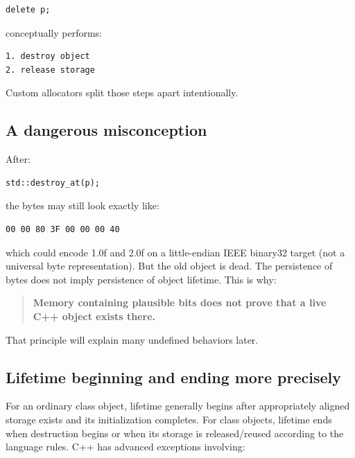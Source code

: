 \begin{verbatim}
delete p;
\end{verbatim}

conceptually performs:

\begin{verbatim}
1. destroy object
2. release storage
\end{verbatim}

Custom allocators split those steps apart intentionally.

\subsection{A dangerous misconception}\label{01-foundations-i-ch002-a-dangerous-misconception}

\hypertarget{01-foundations-i-ch002-a-dangerous-misconception}{}

After:

\begin{verbatim}
std::destroy_at(p);
\end{verbatim}

the bytes may still look exactly like:

\begin{verbatim}
00 00 80 3F 00 00 00 40
\end{verbatim}

which could encode 1.0f and 2.0f on a little-endian IEEE binary32 target (not a universal byte representation). But the old  object is dead. The persistence of bytes does not imply persistence of object lifetime. This is why:

\begin{quote}
\textbf{Memory containing plausible bits does not prove that a live C++ object exists there.}
\end{quote}

That principle will explain many undefined behaviors later.

\subsection{Lifetime beginning and ending more precisely}\label{01-foundations-i-ch002-lifetime-beginning-and-ending-more-precisely}

\hypertarget{01-foundations-i-ch002-lifetime-beginning-and-ending-more-precisely}{}

For an ordinary class object, lifetime generally begins after appropriately aligned storage exists and its initialization completes. For class objects, lifetime ends when destruction begins or when its storage is released/reused according to the language rules. C++ has advanced exceptions involving:

